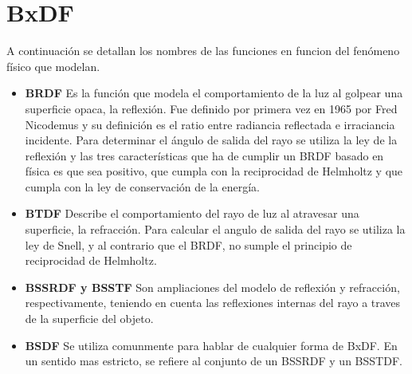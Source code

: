 \section{BxDF}
    \bgroup
    A continuaci\'on se detallan los nombres de las funciones en funcion del fen\'omeno f\'isico que modelan.
    \begin{itemize}
        \item[] \textbf {BRDF} Es la funci\'on que modela el comportamiento de la luz al golpear una superficie opaca, la reflexi\'on. Fue definido por primera vez en 1965 por
        Fred Nicodemus y su definici\'on es el ratio entre radiancia reflectada e irraciancia incidente.
        Para determinar el \'angulo de salida del rayo se utiliza la ley de la reflexi\'on y las tres caracter\'isticas que ha de cumplir un BRDF basado en
        f\'isica es que sea positivo, que cumpla con la reciprocidad de Helmholtz y que cumpla con la ley de conservaci\'on de la energ\'ia.
        \item[] \textbf {BTDF} Describe el comportamiento del rayo de luz al atravesar una superficie, la refracci\'on. Para calcular el angulo de salida del rayo se utiliza la
        ley de Snell, y al contrario que el BRDF, no sumple el principio de reciprocidad de Helmholtz.
        \item[] \textbf {BSSRDF y BSSTF} Son ampliaciones del modelo de reflexi\'on y refracci\'on, respectivamente, teniendo en cuenta las reflexiones internas del rayo a traves de la
        superficie del objeto.
        \item[] \textbf {BSDF} Se utiliza comunmente para hablar de cualquier forma de BxDF. En un sentido mas estricto, se refiere al conjunto de un BSSRDF y un BSSTDF.
    \end{itemize}
    \egroup
